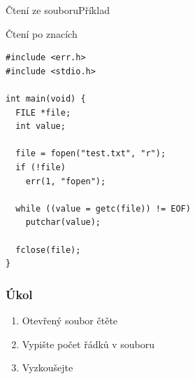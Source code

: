 \begin{frame}[fragile]{Čtení ze souboru}{Příklad}

  \begin{block}{Čtení po znacích}
  \begin{lstlisting}
#include <err.h>
#include <stdio.h>

int main(void) {
  FILE *file;
  int value;

  file = fopen("test.txt", "r");
  if (!file)
    err(1, "fopen");

  while ((value = getc(file)) != EOF)
    putchar(value);

  fclose(file);
}
  \end{lstlisting}
  \end{block}

\end{frame}

\begin{frame}
  \frametitle{Úkol}

  \begin{enumerate}
    \item Otevřený soubor čtěte
    \item Vypište počet řádků v souboru
    \item Vyzkoušejte
  \end{enumerate}

\end{frame}

